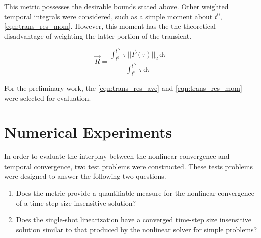 This metric possesses the desirable bounds stated above.
Other weighted temporal integrals were considered, such as a simple moment about $t^{0}$, \eqref{eqn:trans_res_mom}.
However, this moment has the the theoretical disadvantage of weighting the latter portion of the transient.

\begin{equation}
\label{eqn:trans_res_mom}
\vec{R} = \frac{\int_{t^{0}}^{t^{N}} \,\tau\,||\vec{F}(\tau)||_2 \,\mathrm{d} \tau}{\int_{t^{0}}^{t^{N}} \,\tau \,\mathrm{d} \tau}
\end{equation}

For the preliminary work, the \eqref{eqn:trans_res_ave} and \eqref{eqn:trans_res_mom} were selected for evaluation.
\section{Numerical Experiments}
\label{sect:numerical_experiments}

In order to evaluate the interplay between the nonlinear convergence and temporal convergence, two test problems were constructed.
These tests problems were designed to answer the following two questions.

\begin{enumerate}
\item{Does the metric provide a quantifiable measure for the nonlinear convergence of a time-step size insensitive solution?}
\item{Does the single-shot linearization have a converged time-step size insensitive solution similar to that produced by the nonlinear solver for simple problems?}
\end{enumerate}

